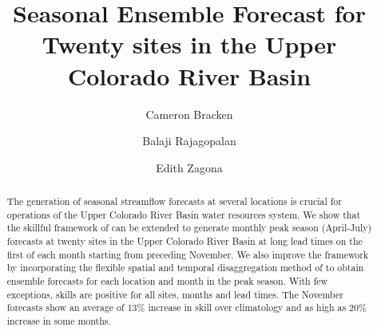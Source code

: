 \documentclass[final,5p,times,twocolumn,authoryear]{elsarticle}
\begin{document}
\begin{frontmatter}



\title{Seasonal Ensemble Forecast for Twenty sites in the Upper Colorado River Basin}

 \author[civil]{Cameron Bracken}
 \author[civil,cires]{Balaji Rajagopalan}
 \author[civil]{Edith Zagona}
 
 \address[civil]{Department of Civil, Environmental, and Architectural Engineering, University of Colorado at Boulder}
 \address[cires]{Cooperative Institute for Research in Environmental Sciences (CIRES)}


\begin{abstract}
The generation of seasonal streamflow forecasts at several locations  is crucial for operations of the Upper Colorado River Basin water resources system. We show that the skillful framework of \cite{Bracken:2010cw} can be extended to generate monthly peak season (April-July) forecasts at twenty sites in the Upper Colorado River Basin at long lead times on the first of each month starting from preceding November. We also improve the framework by incorporating the flexible spatial and temporal disaggregation method of \cite{Nowak:2010ha} to obtain ensemble forecasts for each location and month in the peak season. With few exceptions, skills are positive for all sites, months and lead times. The November forecasts show an average of 13\% increase in skill over climatology and as high as 20\% increase in some months.  
\end{abstract}

\begin{keyword}


\end{keyword}

\end{frontmatter}
\end{document}
